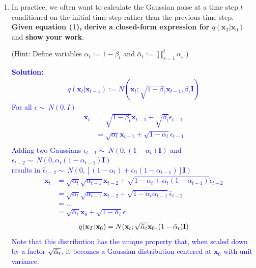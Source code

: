 \documentclass{article}
\begin{document}
\begin{enumerate}
\item
In practice, we often want to calculate the Gaussian noise at a time step $t$ conditioned on the initial time step rather than the previous time step. \textbf{Given equation (1), derive a closed-form expression for $q(\textbf{x}_{T}|\textbf{x}_{0})$} and \textbf{show your work}. 

(Hint: Define variables $\alpha_t := 1 - \beta_t$ and $\bar\alpha_t := \prod_{s = 1}^{t}\alpha_s$.)

\textcolor{blue}{
    \textbf{Solution: } 
    \begin{align*}
        q(\textbf{x}_{t}|\textbf{x}_{t - 1}) := N(\textbf{x}_{t}; \sqrt{1 - \beta_{t}}\textbf{x}_{t-1}, \beta_{t} \textbf{I})
    \end{align*}
        For all $\epsilon \sim\ N(0, I)$
    \begin{align*}
        \textbf{x}_t &= \sqrt{1 - \beta_{t}}\textbf{x}_{t-1} + \sqrt{\beta_{t}}\epsilon_{t-1} \\
        &= \sqrt{\alpha_{t}}\textbf{x}_{t-1} + \sqrt{1 - \alpha_{t}}\epsilon_{t-1}\\
    \end{align*}
        Adding two Gaussians $\epsilon_{t-1} \sim\ N(0, (1-\alpha_t)\textbf{I})$ and $\epsilon_{t-2} \sim\ N(0, \alpha_t(1-\alpha_{t-1})\textbf{I})$ \\
        results in $\hat{\epsilon}_{t-2} \sim\ N(0, \left[(1-\alpha_t)+\alpha_t(1-\alpha_{t-1})\right]\textbf{I})$
    \begin{align*}
        \textbf{x}_t &= \sqrt{\alpha_{t}}\sqrt{\alpha_{t-1}}\textbf{x}_{t-2} + \sqrt{1 - \alpha_t + \alpha_t(1 - \alpha_{t-1})}\hat{\epsilon}_{t-2} \\
        &= \sqrt{\alpha_{t}}\sqrt{\alpha_{t-1}}\textbf{x}_{t-2} + \sqrt{1 - \alpha_t\alpha_{t-1}}\hat{\epsilon}_{t-2} \\
        &= ... \\
        &= \sqrt{\bar{\alpha}_t}\textbf{x}_0 + \sqrt{1 - \bar{\alpha}_t}\epsilon
    \end{align*}
    \begin{align*}
        q(\textbf{x}_{T}|\textbf{x}_{0}) = N(\textbf{x}_t; \sqrt{\Bar{\alpha}_t}\textbf{x}_0, (1 - \Bar{\alpha}_t)\textbf{I})
    \end{align*}
    Note that this distribution has the unique property that, when scaled down by a factor $\sqrt{\Bar{\alpha}_t}$, it becomes a Gaussian distribution centered at $\textbf{x}_0$ with unit variance.
}

\end{enumerate}
\end{document}
